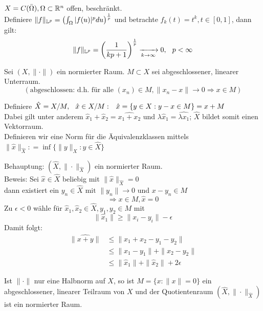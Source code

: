 \begin{beispiel}
$X = C(\bar\Omega), \Omega \subset \mathbb{R}^{n}$ offen, beschränkt. \\
Definiere $\| f \|_{\mathbb{L}^{p}} = \left( \int_{\Omega} |f(u)|^{p} du \right)^{\frac{1}{p}}$ und betrachte $f_{k}(t) = t^k, t \in [0, 1]$, dann gilt:
 \[ \| f \|_{\mathbb{L}^{p}} = \left( \frac{1}{kp + 1} \right)^{\frac{1}{p}} \xrightarrow[k \rightarrow \infty]{} 0, \hspace{0.25cm} p < \infty \]
\end{beispiel}

\begin{definition}[Quotientenräume] 
Sei $(X, \| \cdot \|)$ ein normierter Raum. $M \subset X$ sei abgeschlossener, linearer Unterraum. \[ (\text{abgeschlossen: d.h. für alle } (x_{n}) \in M, \| x_{n} - x \| \rightarrow 0 \Rightarrow x \in M) \]

Definiere $\hat X = X / M, \hspace{0.25cm} \hat x \in X/M: \hspace{0.25cm} \hat x = \{ y \in X: y - x \in M \} = x + M$ \\
Dabei gilt unter anderem $\hat x_{1} + \hat x_{2} = \hat{x_{1} + x_{2}}$ und $\lambda \hat x_{1} = \hat{\lambda x_{1}}$; $\hat X$ bildet somit einen Vektorraum. \\
Definieren wir eine Norm für die Äquivalenzklassen mittels $\| \hat x \|_{\hat X} : = \inf \{ \| y \|_{X}: y \in \hat X \}$

Behauptung: $(\hat X, \| \cdot \|_{\hat X})$ ein normierter Raum. \\
Beweis: Sei $\hat x \in \hat X$ beliebig mit $\| \hat x \|_{\hat X} = 0$ \\
 dann existiert ein $y_{n} \in \hat X \text{ mit } \| y_{n} \| \rightarrow 0$ und $x - y_{n} \in M$
	\[ \Rightarrow x \in M, \hat x = 0 \]
Zu $\epsilon< 0$ wähle für $\hat x_{1}, \hat x_{2} \in \hat X, y_{1}, y_{2} \in M$ mit
	\[ \| \hat x_{1} \| \geq \| x_{i} - y_{i} \| - \epsilon \] 
	Damit folgt:
	\begin{align*}
		\| \hat{x + y} \| & \leq \| x_{1} + x_{2} - y_{1} - y_{2} \| \\
						  & \leq \| x_{1} - y_{1} \| + \| x_{2} - y_{2} \| \\
						  & \leq \| \hat x_{1} \| + \| \hat x_{2} \| + 2 \epsilon
	\end{align*}
\end{definition}

\begin{bemerkung}
Ist $\| \cdot \|$ nur eine Halbnorm auf $X$, so ist $M = \{ x: \| x \| = 0 \}$ ein abgeschlossener, linearer Teilraum von $X$ und der Quotientenraum $(\hat X, \| \cdot \|_{\hat X})$ ist ein normierter Raum.
\end{bemerkung}



